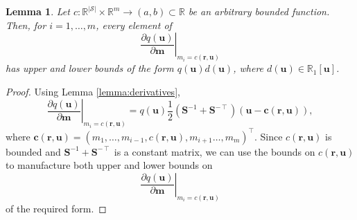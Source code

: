 \documentclass{article}
\newtheorem{lemma}[theorem]{Lemma}
\theoremstyle{definition}
\theoremstyle{remark}
\begin{document}
\begin{lemma} \label{lemma:bound2}
  Let $c : \mathbb{R}^{|\mathcal{S}|} \times \mathbb{R}^m \to (a, b) \subset
  \mathbb{R}$ be an arbitrary bounded function. Then, for $i = 1, \dots, m$,
  every element of
  \[
    \left. \frac{\partial q(\mathbf{u})}{\partial \mathbf{m}} \right|_{m_i =
      c(\mathbf{r}, \mathbf{u})}
  \]
  has upper and lower bounds of the form $q(\mathbf{u})d(\mathbf{u})$,
  where $d(\mathbf{u}) \in \mathbb{R}_1[\mathbf{u}]$.
\end{lemma}
\begin{proof}
  Using Lemma \ref{lemma:derivatives},
  \[
    \left. \frac{\partial q(\mathbf{u})}{\partial \mathbf{m}} \right|_{m_i =
      c(\mathbf{r}, \mathbf{u})} = q(\mathbf{u})\frac{1}{2}(\mathbf{S}^{-1} +
    \mathbf{S}^{-\intercal})(\mathbf{u} - \mathbf{c}(\mathbf{r}, \mathbf{u})),
  \]
  where $\mathbf{c}(\mathbf{r}, \mathbf{u}) = (m_1, \dots, m_{i - 1},
  c(\mathbf{r}, \mathbf{u}), m_{i + 1} \dots, m_m)^\intercal$. Since
  $c(\mathbf{r}, \mathbf{u})$ is bounded and $\mathbf{S}^{-1} +
  \mathbf{S}^{-\intercal}$ is a constant matrix, we can use the bounds on
  $c(\mathbf{r}, \mathbf{u})$ to manufacture both upper and lower bounds on
  \[
     \left. \frac{\partial q(\mathbf{u})}{\partial \mathbf{m}} \right|_{m_i =
      c(\mathbf{r}, \mathbf{u})}
  \]
  of the required form.
\end{proof}
\end{document}
